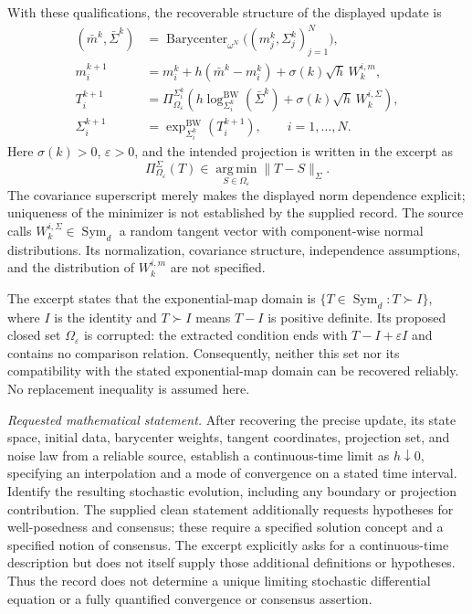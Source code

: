 \documentclass[11pt]{article}
\begin{document}
With these qualifications, the recoverable structure of the displayed update is
\[
\begin{aligned}
 (\bar m^k,\bar\Sigma^k)
 &=\operatorname{Barycenter}_{\omega^N}
       \bigl((m_j^k,\Sigma_j^k)_{j=1}^N\bigr),\\
 m_i^{k+1}
 &=m_i^k+h(\bar m^k-m_i^k)
       +\sigma(k)\sqrt h\,W_k^{i,m},\\
 T_i^{k+1}
 &=\Pi_{\Omega_\varepsilon}^{\Sigma_i^k}
       \left(h\log^{\mathrm{BW}}_{\Sigma_i^k}(\bar\Sigma^k)
             +\sigma(k)\sqrt h\,W_k^{i,\Sigma}\right),\\
 \Sigma_i^{k+1}
 &=\exp^{\mathrm{BW}}_{\Sigma_i^k}(T_i^{k+1}),
 \qquad i=1,\ldots,N.
\end{aligned}
\]
Here \(\sigma(k)>0\), \(\varepsilon>0\), and the intended projection is written in the excerpt as
\[
 \Pi_{\Omega_\varepsilon}^{\Sigma}(T)
 \in\operatorname*{arg\,min}_{S\in\Omega_\varepsilon}\|T-S\|_\Sigma.
\]
The covariance superscript merely makes the displayed norm dependence explicit; uniqueness of the minimizer is not established by the supplied record. The source calls \(W_k^{i,\Sigma}\in\operatorname{Sym}_d\) a random tangent vector with component-wise normal distributions. Its normalization, covariance structure, independence assumptions, and the distribution of \(W_k^{i,m}\) are not specified.

The excerpt states that the exponential-map domain is \(\{T\in\operatorname{Sym}_d:T\succ I\}\), where \(I\) is the identity and \(T\succ I\) means \(T-I\) is positive definite. Its proposed closed set \(\Omega_\varepsilon\) is corrupted: the extracted condition ends with \(T-I+\varepsilon I\) and contains no comparison relation. Consequently, neither this set nor its compatibility with the stated exponential-map domain can be recovered reliably. No replacement inequality is assumed here.

\emph{Requested mathematical statement.} After recovering the precise update, its state space, initial data, barycenter weights, tangent coordinates, projection set, and noise law from a reliable source, establish a continuous-time limit as \(h\downarrow0\), specifying an interpolation and a mode of convergence on a stated time interval. Identify the resulting stochastic evolution, including any boundary or projection contribution. The supplied clean statement additionally requests hypotheses for well-posedness and consensus; these require a specified solution concept and a specified notion of consensus. The excerpt explicitly asks for a continuous-time description but does not itself supply those additional definitions or hypotheses. Thus the record does not determine a unique limiting stochastic differential equation or a fully quantified convergence or consensus assertion.
\end{document}
